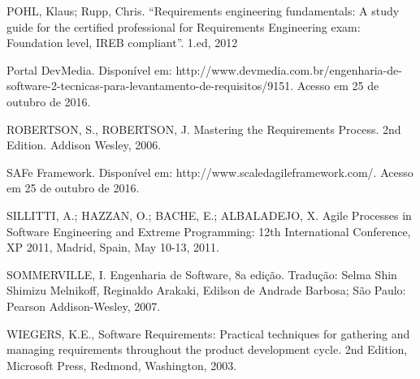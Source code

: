 POHL, Klaus; Rupp, Chris. “Requirements engineering fundamentals: A study guide for the certified professional for Requirements Engineering exam: Foundation level, IREB compliant”. 1.ed, 2012

Portal DevMedia. Disponível em: http://www.devmedia.com.br/engenharia-de-software-2-tecnicas-para-levantamento-de-requisitos/9151. Acesso em 25 de outubro de 2016.

ROBERTSON, S., ROBERTSON, J. Mastering the Requirements Process. 2nd Edition. Addison Wesley, 2006.

SAFe Framework. Disponível em: http://www.scaledagileframework.com/. Acesso em 25 de outubro de 2016.

SILLITTI, A.; HAZZAN, O.; BACHE, E.; ALBALADEJO, X. Agile Processes in Software Engineering and Extreme Programming: 12th International Conference, XP 2011, Madrid, Spain, May 10-13, 2011.

SOMMERVILLE, I. Engenharia de Software, 8a edição. Tradução: Selma Shin Shimizu Melnikoff, Reginaldo Arakaki, Edilson de Andrade Barbosa; São Paulo: Pearson Addison-Wesley, 2007.

WIEGERS, K.E., Software Requirements: Practical techniques for gathering and managing requirements throughout the product development cycle. 2nd Edition, Microsoft Press, Redmond, Washington, 2003. 
